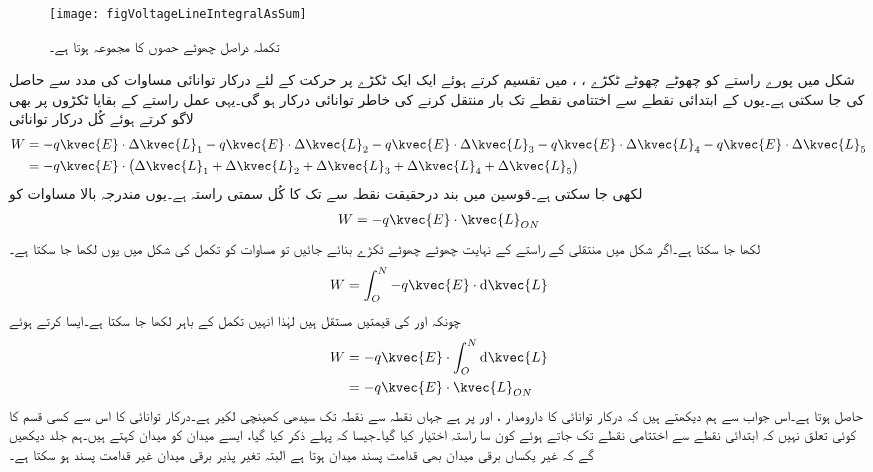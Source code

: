 \begin{figure}
\centering
\texttt{[image: figVoltageLineIntegralAsSum]}
\caption{تکملہ دراصل چھوٹے حصوں کا مجموعہ ہوتا ہے۔}
\label{شکل_دباو_تکملہ_بمع_مجموعہ}
\end{figure}
شکل  میں پورے راستے کو چھوٹے چھوٹے  ٹکڑے ، ،  میں تقسیم  کرتے ہوئے ایک ایک ٹکڑے پر حرکت کے لئے درکار توانائی مساوات  کی مدد سے  حاصل کی جا سکتی ہے۔یوں    کے ابتدائی نقطے سے اختتامی نقطے تک بار  منتقل کرنے کی
 خاطر  توانائی درکار ہو گی۔یہی عمل راستے کے بقایا ٹکڑوں پر بھی لاگو کرتے ہوئے کُل درکار توانائی
\begin{gather}
\begin{aligned}\label{مساوات_دباو_مجموعہ_ٹکڑے}
W&=-q \kvec{E} \cdot \Delta \kvec{L}_1 -q \kvec{E} \cdot \Delta \kvec{L}_2 -q \kvec{E} \cdot \Delta \kvec{L}_3 -q \kvec{E} \cdot \Delta \kvec{L}_4 -q \kvec{E} \cdot \Delta \kvec{L}_5\\
&=-q \kvec{E} \cdot \left(\Delta \kvec{L}_1  +\Delta \kvec{L}_2 +\Delta \kvec{L}_3+\Delta \kvec{L}_4+\Delta \kvec{L}_5\right)
\end{aligned}
\end{gather}
لکھی جا سکتی ہے۔قوسین میں بند  درحقیقت نقطہ  سے  تک کا  کُل سمتی راستہ  ہے۔یوں مندرجہ بالا مساوات کو
\begin{align}
W=-q \kvec{E} \cdot \kvec{L}_{ON}
\end{align}
لکھا جا سکتا ہے۔اگر شکل  میں منتقلی کے راستے کے نہایت چھوٹے چھوٹے ٹکڑے  بنائے جائیں تو مساوات  کو تکمل کی شکل میں یوں لکھا جا سکتا ہے۔
\begin{align}
W=\int_O^N -q \kvec{E} \cdot \dif \kvec{L}
\end{align}
چونکہ  اور  کی قیمتیں مستقل ہیں  لہٰذا انہیں تکمل کے باہر لکھا جا سکتا ہے۔ایسا کرتے ہوئے
\begin{gather}
\begin{aligned}\label{مساوات_توانائی_یکساں_میدان_توانائی_راستے_پر_منحصر_نہیں}
W&=-q \kvec{E} \cdot  \int_O^N \dif \kvec{L}\\
&=-q \kvec{E} \cdot \kvec{L}_{ON}
\end{aligned}
\end{gather}
حاصل ہوتا ہے۔اس جواب سے ہم دیکھتے ہیں کہ درکار توانائی کا دارومدار ،  اور  پر ہے جہاں  نقطہ  سے نقطہ  تک سیدھی کھینچی لکیر ہے۔درکار توانائی کا اس سے کسی قسم کا کوئی تعلق نہیں کہ ابتدائی نقطے سے اختتامی نقطے تک جاتے ہوئے کون سا راستہ اختیار کیا گیا۔جیسا کہ پہلے ذکر کیا گیا، ایسے میدان کو  میدان کہتے ہیں۔ہم جلد دیکھیں گے کہ غیر یکساں برقی میدان بھی قدامت پسند میدان ہوتا ہے البتہ تغیر پذیر  برقی میدان غیر قدامت پسند ہو سکتا ہے۔

